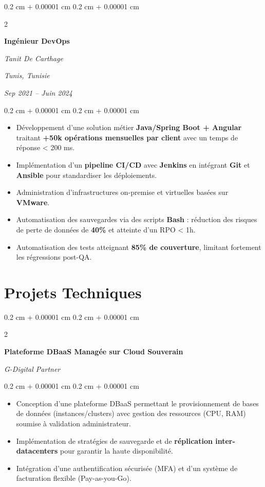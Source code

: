 \documentclass[9pt, letterpaper]{article}
\newenvironment{highlights}{
    \begin{itemize}[
        topsep=0.03 cm,
        parsep=0.03 cm,
        partopsep=0pt,
        itemsep=0pt,
        leftmargin=0.4 cm + 10pt
    ]
}{
    \end{itemize}
}
\newenvironment{onecolentry}{
    \begin{adjustwidth}{
        0.2 cm + 0.00001 cm
    }{
        0.2 cm + 0.00001 cm
    }
}{
    \end{adjustwidth}
}
\newenvironment{twocolentry}[2][]{
    \onecolentry
    \def\secondColumn{#2}
    \setcolumnwidth{\fill, 4.5 cm}
    \begin{paracol}{2}
}{
    \switchcolumn \raggedleft \secondColumn
    \end{paracol}
    \endonecolentry
}
\begin{document}
    \vspace{0.03 cm}
    \begin{twocolentry}{
        \textit{Tunis, Tunisie}

        \textit{Sep 2021 -- Juin 2024}}
        \textbf{Ingénieur DevOps}

\textit{Tanit De Carthage}
\end{twocolentry}
\begin{onecolentry}
    \begin{highlights}

\item Développement d'une solution métier \textbf{Java/Spring Boot + Angular} traitant \textbf{+50k opérations mensuelles par client} avec un temps de réponse < 200 ms.
        \item Implémentation d'un \textbf{pipeline CI/CD} avec \textbf{Jenkins} en intégrant \textbf{Git} et \textbf{Ansible} pour standardiser les déploiements.
        \item Administration d'infrastructures on-premise et virtuelles basées sur \textbf{VMware}.
        \item Automatisation des sauvegardes via des scripts \textbf{Bash} : réduction des risques de perte de données de \textbf{40\%} et atteinte d'un RPO < 1h.
\item Automatisation des tests atteignant \textbf{85\% de couverture}, limitant fortement les régressions post-QA.
    \end{highlights}
\end{onecolentry}

\vspace{0.3 cm}

\section{Projets Techniques}

\begin{twocolentry}{
    \textit{G-Digital Partner}}
    \textbf{Plateforme DBaaS Managée sur Cloud Souverain}
\end{twocolentry}
\begin{onecolentry}
    \begin{highlights}
        \item Conception d'une plateforme DBaaS permettant le provisionnement de bases de données (instances/clusters) avec gestion des ressources (CPU, RAM) soumise à validation administrateur.
        \item Implémentation de stratégies de sauvegarde et de \textbf{réplication inter-datacenters} pour garantir la haute disponibilité.
        \item Intégration d'une authentification sécurisée (MFA) et d'un système de facturation flexible (Pay-as-you-Go).
    \end{highlights}
\end{onecolentry}
\end{document}
